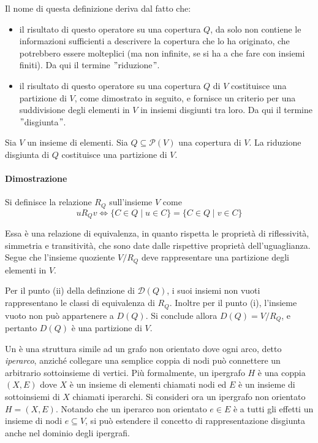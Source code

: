 Il nome di questa definizione deriva dal fatto che:
\begin{itemize}
    \item il risultato di questo operatore su una copertura $Q$, da solo non contiene le informazioni sufficienti a
        descrivere la copertura che lo ha originato, che potrebbero essere molteplici (ma non infinite, se si ha a che
        fare con insiemi finiti). %
        Da qui il termine \("\)riduzione\("\).
    \item il risultato di questo operatore su una copertura $Q$ di $V$ costituisce una partizione di $V$, come
        dimostrato in seguito, e fornisce un criterio per una suddivisione degli elementi in $V$ in insiemi disgiunti
        tra loro.
        Da qui il termine \("\)disgiunta\("\).
\end{itemize}

\begin{proposition}
Sia $V$ un insieme di elementi. Sia $Q \subseteq \mathcal{P}(V)$ una copertura di $V$.
La riduzione disgiunta di $Q$ costituisce una partizione di $V$.
\end{proposition}

\paragraph{Dimostrazione}
Si definisce la relazione $R_Q$ sull'insieme $V$ come
\begin{equation*}
    uR_{Q}v \Leftrightarrow \{C \in Q \mid u \in C\} = \{C \in Q \mid v \in C\}
\end{equation*}

Essa \`e una relazione di equivalenza, in quanto rispetta le propriet\`a di riflessivit\`a, simmetria e transitivit\`a,
che sono date dalle rispettive propriet\`a dell'uguaglianza.
Segue che l'insieme quoziente $V/R_{Q}$ deve rappresentare una partizione degli elementi in $V$.

Per il punto (ii) della definzione di $\mathcal{D}(Q)$, i suoi insiemi non vuoti rappresentano le classi di equivalenza
di $R_Q$.
Inoltre per il punto (i), l'insieme vuoto non pu\`o appartenere a $D(Q)$.
Si conclude allora $D(Q) = V/R_{Q}$, e pertanto $D(Q)$ \`e una partizione di $V$.

Un  è una struttura simile ad un grafo non orientato dove ogni arco, detto \textit{iperarco},
anziché collegare una semplice coppia di nodi può connettere un arbitrario sottoinsieme di vertici.
Più formalmente, un ipergrafo $H$ è una coppia $(X, E)$ dove $X$ è un insieme di elementi chiamati nodi ed $E$ è
un insieme di sottoinsiemi di $X$ chiamati iperarchi.
Si consideri ora un ipergrafo non orientato $H = (X, E)$.
Notando che un iperarco non orientato $e \in E$ è a tutti gli effetti un insieme di nodi $e \subseteq V$,
si pu\`o estendere il concetto di rappresentazione disgiunta anche nel dominio degli ipergrafi.

